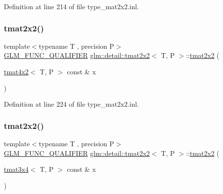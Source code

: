 Definition at line 214 of file type\+\_\+mat2x2.\+inl.

\mbox{\label{structglm_1_1detail_1_1tmat2x2_a124fb38aa5a54a8c912e5612b69aabd8}} 
\subsubsection{\texorpdfstring{tmat2x2()}{tmat2x2()}\hspace{0.1cm}{\footnotesize\ttfamily [16/22]}}
{\footnotesize\ttfamily template$<$typename T , precision P$>$ \\
\hyperlink{setup_8hpp_a33fdea6f91c5f834105f7415e2a64407}{G\+L\+M\+\_\+\+F\+U\+N\+C\+\_\+\+Q\+U\+A\+L\+I\+F\+I\+ER} \hyperlink{structglm_1_1detail_1_1tmat2x2}{glm\+::detail\+::tmat2x2}$<$ T, P $>$\+::\hyperlink{structglm_1_1detail_1_1tmat2x2}{tmat2x2} (\begin{DoxyParamCaption}\item[{\hyperlink{structglm_1_1detail_1_1tmat4x2}{tmat4x2}$<$ T, P $>$ const \&}]{x }\end{DoxyParamCaption})\hspace{0.3cm}{\ttfamily [explicit]}}



Definition at line 224 of file type\+\_\+mat2x2.\+inl.

\mbox{\label{structglm_1_1detail_1_1tmat2x2_a197a18fc9c265eb65da1bc0df80224cf}} 
\subsubsection{\texorpdfstring{tmat2x2()}{tmat2x2()}\hspace{0.1cm}{\footnotesize\ttfamily [17/22]}}
{\footnotesize\ttfamily template$<$typename T , precision P$>$ \\
\hyperlink{setup_8hpp_a33fdea6f91c5f834105f7415e2a64407}{G\+L\+M\+\_\+\+F\+U\+N\+C\+\_\+\+Q\+U\+A\+L\+I\+F\+I\+ER} \hyperlink{structglm_1_1detail_1_1tmat2x2}{glm\+::detail\+::tmat2x2}$<$ T, P $>$\+::\hyperlink{structglm_1_1detail_1_1tmat2x2}{tmat2x2} (\begin{DoxyParamCaption}\item[{\hyperlink{structglm_1_1detail_1_1tmat3x4}{tmat3x4}$<$ T, P $>$ const \&}]{x }\end{DoxyParamCaption})\hspace{0.3cm}{\ttfamily [explicit]}}



